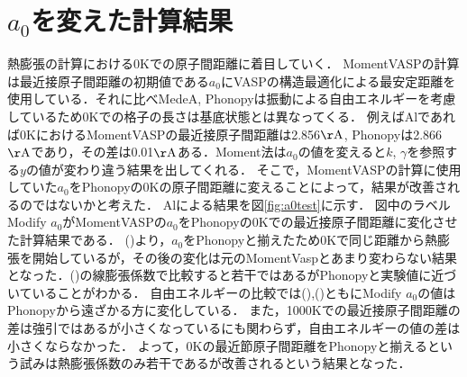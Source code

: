 \section{$a_0$を変えた計算結果}
熱膨張の計算における0Kでの原子間距離に着目していく．
MomentVASPの計算は最近接原子間距離の初期値である$a_0$にVASPの構造最適化による最安定距離を使用している．それに比べMedeA, Phonopyは振動による自由エネルギーを考慮しているため0Kでの格子の長さは基底状態とは異なってくる．
例えばAlであれば0KにおけるMomentVASPの最近接原子間距離は2.856$\mathrm{\AA}$, Phonopyは2.866$\mathrm{\AA}$であり，その差は0.01$\mathrm{\AA}$ある．Moment法は$a_0$の値を変えると$k$, $\gamma$を参照する$y$の値が変わり違う結果を出してくれる．
そこで，MomentVASPの計算に使用していた$a_0$をPhonopyの0Kの原子間距離に変えることによって，結果が改善されるのではないかと考えた．
Alによる結果を図\ref{fig:a0test}に示す．
図中のラベルModify $a_0$がMomentVASPの$a_0$をPhonopyの0Kでの最近接原子間距離に変化させた計算結果である．
()より，$a_0$をPhonopyと揃えたため0Kで同じ距離から熱膨張を開始しているが，その後の変化は元のMomentVaspとあまり変わらない結果となった．()の線膨張係数で比較すると若干ではあるがPhonopyと実験値に近づいていることがわかる．
自由エネルギーの比較では(),()ともにModify $a_0$の値はPhonopyから遠ざかる方に変化している．
また，1000Kでの最近接原子間距離の差は強引ではあるが小さくなっているにも関わらず，自由エネルギーの値の差は小さくならなかった．
よって，0Kの最近節原子間距離をPhonopyと揃えるという試みは熱膨張係数のみ若干であるが改善されるという結果となった．

